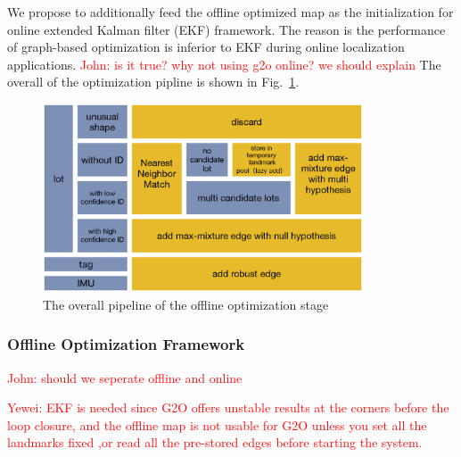 \documentclass[journal]{IEEEtran}
\newcommand{\Reffig}[1]{Fig.~\ref{#1}}
\newcommand{\COMMENT}[1]{\textcolor{red}{#1}}
\begin{document}
%

We propose to additionally feed the offline optimized map as the initialization for online extended Kalman filter (EKF) framework.
The reason is the performance of graph-based optimization is inferior to EKF during online localization applications.
\COMMENT{John: is it true? why not using g2o online? we should explain}
The overall of the optimization pipline is shown in \Reffig{fig:8}. 

\begin{figure}
\centering
\includegraphics[height = 2.2in]{pic/fig8_Optimize}
\caption{
The overall pipeline of the offline optimization stage
}\label{fig:8}
\end{figure}

\subsubsection{Offline Optimization Framework}
\COMMENT{John: should we seperate offline and online }

\COMMENT{Yewei: EKF is needed since G2O offers unstable results at the corners before the loop closure, and the offline map is not usable for G2O unless you set all the landmarks fixed ,or read all the pre-stored edges before starting the system.}
\end{document}
